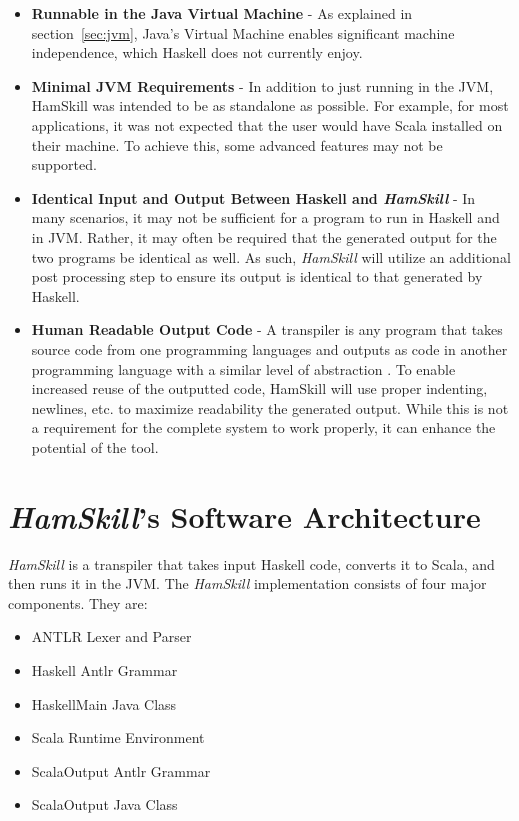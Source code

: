 \documentclass{report}
\begin{document}
\begin{itemize}

\item \textbf{Runnable in the Java Virtual Machine} - As explained in section~\ref{sec:jvm}, Java's Virtual Machine enables significant machine independence, which Haskell does not currently enjoy.

\item \textbf{Minimal JVM Requirements} - In addition to just running in the JVM, HamSkill was intended to be as standalone as possible.  For example, for most applications, it was not expected that the user would have Scala installed on their machine.  To achieve this, some advanced features may not be supported.

\item \textbf{Identical Input and Output Between Haskell and \emph{HamSkill}} - In many scenarios, it may not be sufficient for a program to run in Haskell and in JVM.  Rather, it may often be required that the generated output for the two programs be identical as well.  As such, \emph{HamSkill} will utilize an additional post processing step to ensure its output is identical to that generated by Haskell.

\item \textbf{Human Readable Output Code} - A transpiler is any program that takes source code from one programming languages and outputs as code in another programming language with a similar level of abstraction \cite{jansen_2015}.  To enable increased reuse of the outputted code, HamSkill will use proper indenting, newlines, etc. to maximize readability the generated output.  While this is not a requirement for the complete system to work properly, it can enhance the potential of the tool.

\end{itemize}

\section{\textit{HamSkill}'s Software Architecture}\label{sec:hamskillSoftwareArchitecture}

\emph{HamSkill} is a transpiler that takes input Haskell code, converts it to Scala, and then runs it in the JVM.  The \emph{HamSkill} implementation consists of four major components.  They are:

\begin{itemize}
   \item ANTLR Lexer and Parser
   \item Haskell Antlr Grammar
   \item HaskellMain Java Class
   \item Scala Runtime Environment
   \item ScalaOutput Antlr Grammar
   \item ScalaOutput Java Class
\end{itemize}
\end{document}
